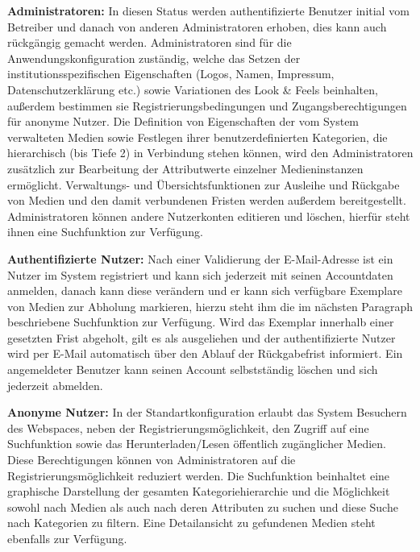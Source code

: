 \documentclass{article}
\begin{document}
\begin{flushleft}
\textbf{Administratoren:} In diesen Status werden authentifizierte Benutzer initial vom Betreiber und danach von anderen Administratoren erhoben, dies kann auch rückgängig gemacht werden. Administratoren sind für die Anwendungskonfiguration zuständig, welche das Setzen der institutionsspezifischen Eigenschaften (Logos, Namen, Impressum, Datenschutzerklärung etc.) sowie Variationen des Look \& Feels beinhalten, außerdem bestimmen sie Registrierungsbedingungen und Zugangsberechtigungen für anonyme Nutzer.  Die Definition von Eigenschaften der vom System verwalteten Medien sowie Festlegen ihrer benutzerdefinierten Kategorien, die hierarchisch (bis Tiefe 2) in Verbindung stehen können, wird den Administratoren zusätzlich zur Bearbeitung der Attributwerte einzelner Medieninstanzen ermöglicht. Verwaltungs- und Übersichtsfunktionen zur Ausleihe und Rückgabe von Medien und den damit verbundenen Fristen werden außerdem bereitgestellt. Administratoren können andere Nutzerkonten editieren und löschen, hierfür steht ihnen eine Suchfunktion zur Verfügung. 
\end{flushleft}

\begin{flushleft}
\textbf{Authentifizierte Nutzer:} Nach einer Validierung der E-Mail-Adresse ist ein Nutzer im System registriert und kann sich jederzeit mit seinen Accountdaten anmelden, danach kann diese verändern und er kann sich verfügbare Exemplare von Medien zur Abholung markieren, hierzu steht ihm die im nächsten Paragraph beschriebene Suchfunktion zur Verfügung. Wird das Exemplar innerhalb einer gesetzten Frist abgeholt, gilt es als ausgeliehen und der authentifizierte Nutzer wird per E-Mail automatisch über den Ablauf der Rückgabefrist informiert. Ein angemeldeter Benutzer kann seinen Account selbstständig löschen und sich jederzeit abmelden.
\end{flushleft}

\begin{flushleft}
\textbf{Anonyme Nutzer:} In der Standartkonfiguration erlaubt das System Besuchern des Webspaces, neben der Registrierungsmöglichkeit, den Zugriff auf eine Suchfunktion sowie das Herunterladen/Lesen öffentlich zugänglicher Medien. Diese Berechtigungen können von Administratoren auf die Registrierungsmöglichkeit reduziert werden. Die Suchfunktion beinhaltet eine graphische Darstellung der gesamten Kategoriehierarchie und die Möglichkeit sowohl nach Medien als auch nach deren Attributen zu suchen und diese Suche nach Kategorien zu filtern. Eine Detailansicht zu gefundenen Medien steht ebenfalls zur Verfügung.
\end{flushleft}
\end{document}
